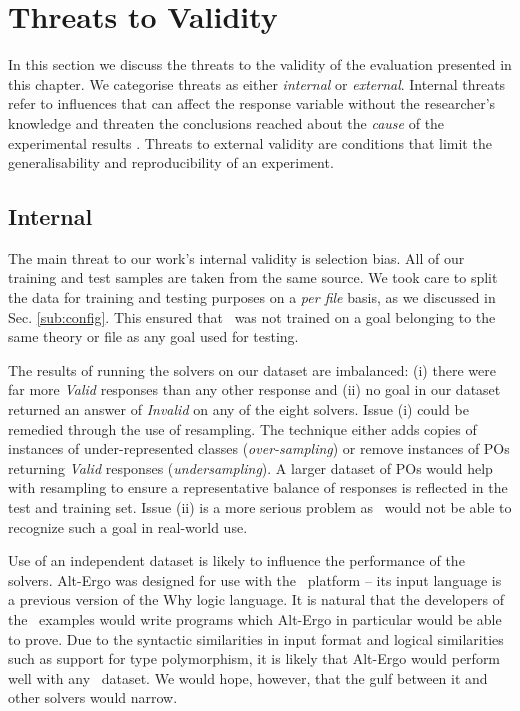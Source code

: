 \section{Threats to Validity}
\label{sec:threats}

In this section we discuss the threats to the validity of the evaluation presented in this chapter.
We categorise threats as either \textit{internal} or \textit{external}.
Internal threats refer to influences that can affect the response variable without the researcher's knowledge and threaten the conclusions reached about the \textit{cause} of the experimental results \cite{experimentation}. 
Threats to external validity are conditions that limit the generalisability and reproducibility of an experiment. 

\subsection{Internal}

The main threat to our work's internal validity is selection bias. All of our training and test samples are taken from the same source. 
We took care to split the data for training and testing purposes on a \textit{per file} basis, as we discussed in Sec. \ref{sub:config}. 
This ensured that \where~was not trained on a goal belonging to the same theory or file as any goal used for testing.
 
The results of running the solvers on our dataset are imbalanced: (i) there were far more \textit{Valid} responses than any other response and (ii) no goal in our dataset returned an answer of \textit{Invalid} on any of the eight solvers. 
Issue (i) could be remedied through the use of resampling.
The technique either adds copies of instances of under-represented classes (\textit{over-sampling}) or remove instances of POs returning \textit{Valid} responses (\textit{undersampling}).
A larger dataset of POs would help with resampling to ensure a representative balance of responses is reflected in the test and training set. 
Issue (ii) is a more serious problem as \where~would not be able to recognize such a goal in real-world use. 

Use of an independent dataset is likely to influence the performance of the solvers. 
Alt-Ergo was designed for use with the \why~platform -- its input language is a previous version of the Why logic language. 
It is natural that the developers of the \why~examples would write programs which Alt-Ergo in particular would be able to prove. 
Due to the syntactic similarities in input format and logical similarities such as support for type polymorphism, it is likely that Alt-Ergo would perform well with any \why~dataset. We would hope, however, that the gulf between it and other solvers would narrow.

